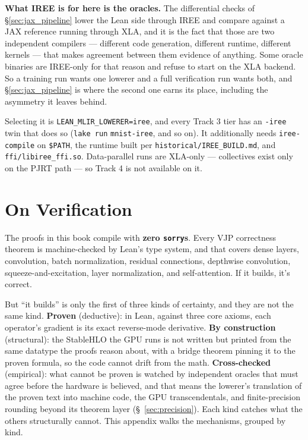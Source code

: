 \medskip\noindent \textbf{What IREE is for here is the oracles.} The
differential checks of \S\ref{sec:jax_pipeline} lower the Lean side through IREE
and compare against a JAX reference running through XLA, and it is the fact that
those are two independent compilers --- different code generation, different
runtime, different kernels --- that makes agreement between them evidence of
anything. Some oracle binaries are IREE-only for that reason and refuse to start
on the XLA backend. So a training run wants one lowerer and a full verification
run wants both, and \S\ref{sec:jax_pipeline} is where the second one earns its
place, including the asymmetry it leaves behind.

\medskip\noindent Selecting it is \texttt{LEAN\_MLIR\_LOWERER=iree}, and every
Track 3 tier has an \texttt{-iree} twin that does so (\texttt{lake run}
\texttt{mnist-iree}, and so on). It additionally needs \texttt{iree-compile}
on \texttt{\$PATH}, the runtime built per
\texttt{historical/\allowbreak IREE\_BUILD.md}, and
\texttt{ffi/\allowbreak libiree\_ffi.so}. Data-parallel runs are XLA-only --- collectives
exist only on the PJRT path --- so Track 4 is not available on it.

\chapter{On Verification}
\label{app:verification}

The proofs in this book compile with \textbf{zero \texttt{sorry}s}.
Every VJP correctness theorem is machine-checked by Lean's type system,
and that covers dense layers, convolution, batch normalization, residual
connections, depthwise convolution, squeeze-and-excitation, layer
normalization, and self-attention. If it builds, it's correct.

But ``it builds'' is only the first of three kinds of certainty,
and they are not the same kind. \textbf{Proven} (deductive): in Lean,
against three core axioms, each operator's gradient is its exact
reverse-mode derivative. \textbf{By construction} (structural): the
StableHLO the GPU runs is not written but printed from the same
datatype the proofs reason about, with a bridge theorem pinning it to the
proven formula, so the code cannot drift from the math.
\textbf{Cross-checked} (empirical): what cannot be proven is watched by
independent oracles that must agree before the hardware is believed, and
that means the lowerer's translation of the proven text into machine code,
the GPU transcendentals, and finite-precision rounding beyond its theorem
layer (\S~\ref{sec:precision}). Each kind catches what the others structurally
cannot. This appendix walks the mechanisms, grouped by kind.


